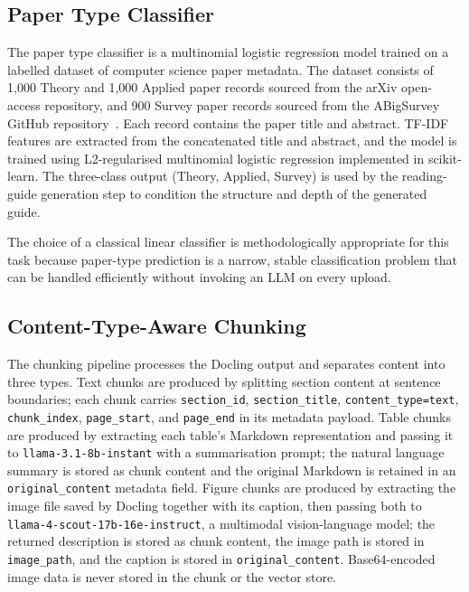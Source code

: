 \documentclass[12pt,a4paper]{report}
\begin{document}
\subsection{Paper Type Classifier}
\label{subsec:classifier}

The paper type classifier is a multinomial logistic regression model trained on
a labelled dataset of computer science paper metadata. The dataset consists of
1{,}000 Theory and 1{,}000 Applied paper records sourced from the arXiv
open-access repository, and 900 Survey paper records sourced from the
ABigSurvey GitHub repository~\cite{niutrans2021}. Each record contains the
paper title and abstract. TF-IDF features are extracted from the concatenated
title and abstract, and the model is trained using L2-regularised multinomial
logistic regression implemented in scikit-learn. The three-class output
(Theory, Applied, Survey) is used by the reading-guide generation step to
condition the structure and depth of the generated guide.

The choice of a classical linear classifier is methodologically appropriate for
this task because paper-type prediction is a narrow, stable classification
problem that can be handled efficiently without invoking an LLM on every
upload.

\subsection{Content-Type-Aware Chunking}

The chunking pipeline processes the Docling output and separates content into
three types. Text chunks are produced by splitting section content at sentence
boundaries; each chunk carries \texttt{section\_id}, \texttt{section\_title},
\texttt{content\_type=text}, \texttt{chunk\_index}, \texttt{page\_start}, and
\texttt{page\_end} in its metadata payload. Table chunks are produced by
extracting each table's Markdown representation and passing it to
\texttt{llama-3.1-8b-instant} with a summarisation prompt; the natural language
summary is stored as chunk content and the original Markdown is retained in an
\texttt{original\_content} metadata field. Figure chunks are produced by
extracting the image file saved by Docling together with its caption, then
passing both to \texttt{llama-4-scout-17b-16e-instruct}, a multimodal
vision-language model; the returned description is stored as chunk content, the
image path is stored in \texttt{image\_path}, and the caption is stored in
\texttt{original\_content}. Base64-encoded image data is never stored in the
chunk or the vector store.
\end{document}
